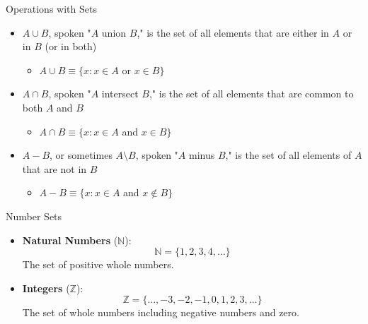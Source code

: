 \documentclass[aspectratio=169]{beamer}
\begin{document}
\begin{frame}{Operations with Sets}\label{main1}
\begin{itemize}
	\begin{itemize}
		\item $A \cup B$, spoken "$A$ union $B$," is the set of all elements that are either in $A$ or in $B$ (or in both)
		\begin{itemize}
			\item $A \cup B \equiv \{ x : x \in A $ or $ x \in B \} $
		\end{itemize}
	\item $A \cap B$, spoken "$A$ intersect $B$," is the set of all elements that are common to both $A$ and $B$
		\begin{itemize}
			\item $A \cap B \equiv \{ x : x \in A $ and $ x \in B \} $
		\end{itemize}
	\item $A - B$, or sometimes $A \setminus B$, spoken "$A$ minus $B$," is the set of all elements of $A$ that are not in $B$
		\begin{itemize}
			\item $A - B \equiv \{ x : x \in A $ and $ x \notin B \} $
		\end{itemize}
		\end{itemize}
	\end{itemize}
\end{frame}

\begin{frame}{Number Sets}
\begin{itemize}
    \item \textbf{Natural Numbers} (\( \mathbb{N} \)):\\
    \[
    \mathbb{N} = \{1, 2, 3, 4, \dots\}
    \]
    The set of positive whole numbers.

    \item \textbf{Integers} (\( \mathbb{Z} \)):\\
    \[
    \mathbb{Z} = \{\dots, -3, -2, -1, 0, 1, 2, 3, \dots\}
    \]
    The set of whole numbers including negative numbers and zero.
\end{itemize}
\end{frame}
\end{document}
